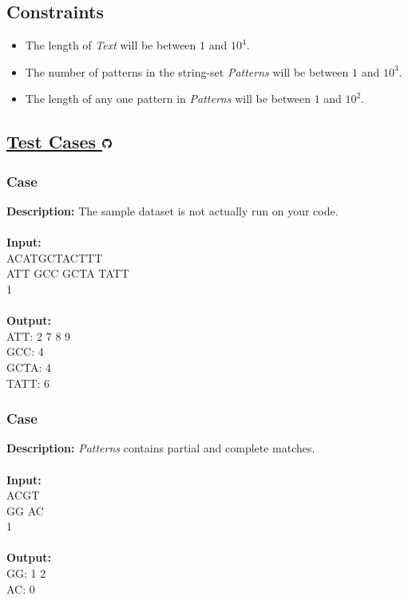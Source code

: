 \documentclass{article}
\newcommand{\code}[1]{{\fontfamily{pcr}\selectfont #1}}
\newcommand{\gitlogo}{\includegraphics[height=12.5]{c0/gitlogo.png}}
\begin{document}
\subsection*{Constraints}
\begin{itemize}
    \item The length of \emph{Text} will be between $1$ and $10^4$.
    \item The number of patterns in the string-set \emph{Patterns} will be between $1$ and $10^3$.
    \item The length of any one pattern in \emph{Patterns} will be between $1$ and $10^2$.
\end{itemize}
\pagebreak

\subsection*{\href{https://github.com/rjeveloff/BA_problemregister/tree/main/test_cases/chapter_9/9O}{Test Cases \gitlogo}}
\subsubsection*{Case }
\hline \vspace{5}
\textbf{Description:} The sample dataset is not actually run on your code.\\ \\
\noindent \textbf{Input:}\\
\code{ACATGCTACTTT\\ATT GCC GCTA TATT\\1}\\ \\
\noindent \textbf{Output:}\\
\code{ATT: 2 7 8 9\\GCC: 4\\GCTA: 4\\TATT: 6}

\subsubsection*{Case }
\hline \vspace{5}
\textbf{Description:} \emph{Patterns} contains partial and complete matches.\\ \\
\noindent \textbf{Input:}\\
\code{ACGT \\ GG AC \\ 1}\\ \\
\noindent \textbf{Output:}\\
\code{GG: 1 2 \\ AC: 0}
\end{document}

